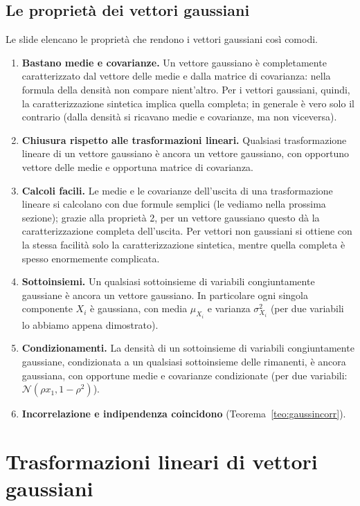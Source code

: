 \subsection{Le proprietà dei vettori gaussiani}

Le slide elencano le proprietà che rendono i vettori gaussiani così comodi.
\begin{enumerate}
  \item \textbf{Bastano medie e covarianze.} Un vettore gaussiano è completamente caratterizzato dal vettore delle medie
        e dalla matrice di covarianza: nella formula della densità non compare nient'altro. Per i vettori gaussiani,
        quindi, la caratterizzazione sintetica implica quella completa; in generale è vero solo il contrario (dalla
        densità si ricavano medie e covarianze, ma non viceversa).
  \item \textbf{Chiusura rispetto alle trasformazioni lineari.} Qualsiasi trasformazione lineare di un vettore
        gaussiano è ancora un vettore gaussiano, con opportuno vettore delle medie e opportuna matrice di covarianza.
  \item \textbf{Calcoli facili.} Le medie e le covarianze dell'uscita di una trasformazione lineare si calcolano con due
        formule semplici (le vediamo nella prossima sezione); grazie alla proprietà 2, per un vettore gaussiano questo
        dà la caratterizzazione completa dell'uscita. Per vettori non gaussiani si ottiene con la stessa facilità solo la
        caratterizzazione sintetica, mentre quella completa è spesso enormemente complicata.
  \item \textbf{Sottoinsiemi.} Un qualsiasi sottoinsieme di variabili congiuntamente gaussiane è ancora un vettore
        gaussiano. In particolare ogni singola componente $X_i$ è gaussiana, con media $\mu_{X_i}$ e varianza
        $\sigma_{X_i}^2$ (per due variabili lo abbiamo appena dimostrato).
  \item \textbf{Condizionamenti.} La densità di un sottoinsieme di variabili congiuntamente gaussiane, condizionata a un
        qualsiasi sottoinsieme delle rimanenti, è ancora gaussiana, con opportune medie e covarianze condizionate (per
        due variabili: $\mathcal{N}(\rho x_1, 1 - \rho^2)$).
  \item \textbf{Incorrelazione e indipendenza coincidono} (Teorema~\ref{teo:gaussincorr}).
\end{enumerate}

\section{Trasformazioni lineari di vettori gaussiani}

